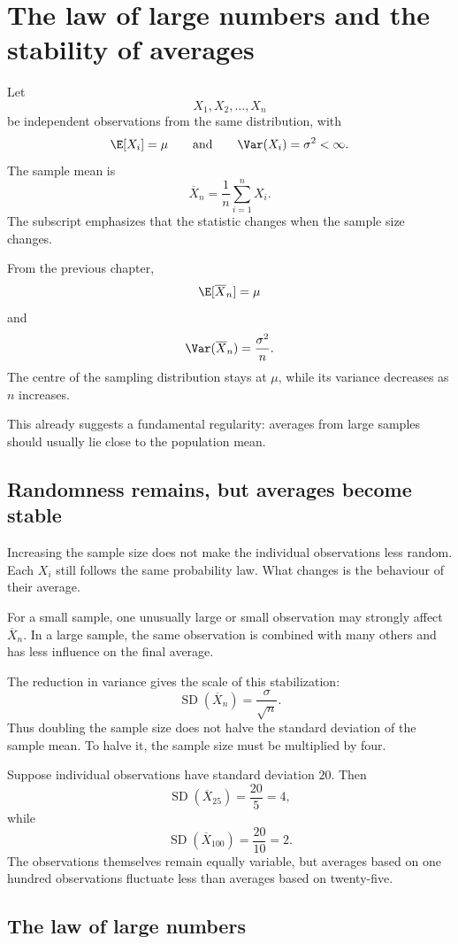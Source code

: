 \section{The law of large numbers and the stability of averages}

Let
\[
X_1,X_2,\ldots,X_n
\]
be independent observations from the same distribution, with
\[
\E[X_i]=\mu
\qquad\text{and}\qquad
\Var(X_i)=\sigma^2<\infty.
\]
The sample mean is
\[
\overline X_n=\frac1n\sum_{i=1}^nX_i.
\]
The subscript emphasizes that the statistic changes when the sample size changes.

From the previous chapter,
\[
\E[\overline X_n]=\mu
\]
and
\[
\Var(\overline X_n)=\frac{\sigma^2}{n}.
\]
The centre of the sampling distribution stays at \(\mu\), while its variance
decreases as \(n\) increases.

This already suggests a fundamental regularity: averages from large samples
should usually lie close to the population mean.

\subsection*{Randomness remains, but averages become stable}

Increasing the sample size does not make the individual observations less
random. Each \(X_i\) still follows the same probability law. What changes is the
behaviour of their average.

For a small sample, one unusually large or small observation may strongly affect
\(\overline X_n\). In a large sample, the same observation is combined with many
others and has less influence on the final average.

The reduction in variance gives the scale of this stabilization:
\[
\operatorname{SD}(\overline X_n)=\frac{\sigma}{\sqrt n}.
\]
Thus doubling the sample size does not halve the standard deviation of the
sample mean. To halve it, the sample size must be multiplied by four.

\begin{examplebox}
Suppose individual observations have standard deviation \(20\). Then
\[
\operatorname{SD}(\overline X_{25})=\frac{20}{5}=4,
\]
while
\[
\operatorname{SD}(\overline X_{100})=\frac{20}{10}=2.
\]
The observations themselves remain equally variable, but averages based on one
hundred observations fluctuate less than averages based on twenty-five.
\end{examplebox}

\subsection*{The law of large numbers}

